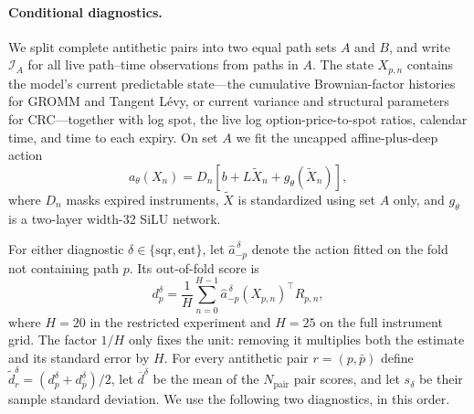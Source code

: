 \documentclass[smallextended,envcountsame,envcountsect]{svjour3}
\begin{document}
\paragraph{Conditional diagnostics.}
We split complete antithetic pairs into two equal path sets $A$ and $B$, and
write $\mathcal I_A$ for all live path--time observations from paths in $A$.
The state $X_{p,n}$ contains the model's current predictable state---the
cumulative Brownian-factor histories for GROMM and Tangent L\'evy, or current
variance and structural parameters for CRC---together with log spot, the live
log option-price-to-spot ratios, calendar time, and time to each expiry.  On
set $A$ we fit the uncapped affine-plus-deep action
\begin{equation}\label{eq:numerics-action-map}
  a_\theta(X_n)
  =D_n\left[b+L\widetilde X_n+g_\theta(\widetilde X_n)\right],
\end{equation}
where $D_n$ masks expired instruments, $\widetilde X$ is standardized using
set $A$ only, and $g_\theta$ is a two-layer width-32 SiLU network.

For either diagnostic $\delta\in\{\mathrm{sqr},\mathrm{ent}\}$, let
$\widehat a_{-p}^{\,\delta}$ denote the action fitted on the fold not
containing path $p$.  Its out-of-fold score is
\begin{equation}\label{eq:numerics-action-path-score}
  d_p^\delta
  =\frac1H\sum_{n=0}^{H-1}
    \widehat a_{-p}^{\,\delta}(X_{p,n})^\top R_{p,n},
\end{equation}
where $H=20$ in the restricted experiment and $H=25$ on the full instrument
grid.  The factor $1/H$ only fixes the unit: removing it multiplies both the
estimate and its standard error by $H$.  For every antithetic pair
$r=(p,\bar p)$ define
$\widetilde d_r^\delta=(d_p^\delta+d_{\bar p}^\delta)/2$, let
$\overline d^\delta$ be the mean of the $N_{\mathrm{pair}}$ pair scores, and
let $s_\delta$ be their sample standard deviation.  We use the following two
diagnostics, in this order.
\end{document}
